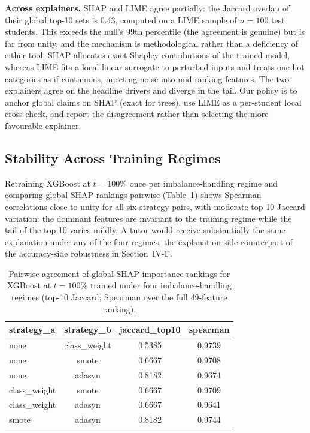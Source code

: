 \documentclass[conference]{IEEEtran}
\begin{document}
\textbf{Across explainers.}
SHAP and LIME agree partially: the Jaccard overlap of their global top-10
sets is 0.43, computed on a LIME sample of $n=100$ test
students. This exceeds the null's 99th percentile (the agreement is genuine)
but is far from unity, and the mechanism is methodological rather than a
deficiency of either tool: SHAP allocates exact Shapley contributions of the
trained model, whereas LIME fits a local linear surrogate to perturbed
inputs and treats one-hot categories as if continuous, injecting noise into
mid-ranking features. The two explainers agree on the headline drivers and
diverge in the tail. Our policy is to anchor global claims on SHAP (exact
for trees), use LIME as a per-student local cross-check, and report the
disagreement rather than selecting the more favourable explainer.

\subsection{Stability Across Training Regimes}

Retraining XGBoost at $t=100\%$ once per imbalance-handling regime and
comparing global SHAP rankings pairwise (Table~\ref{tab:xai_strategies})
shows Spearman correlations close to unity for all six strategy pairs, with
moderate top-10 Jaccard variation: the dominant features are invariant to
the training regime while the tail of the top-10 varies mildly. A tutor
would receive substantially the same explanation under any of the four
regimes, the explanation-side counterpart of the accuracy-side robustness
in Section~IV-F.

\begin{table}[t]
\centering
\caption{Pairwise agreement of global SHAP importance rankings for XGBoost
at $t=100\%$ trained under four imbalance-handling regimes (top-10 Jaccard;
Spearman over the full 49-feature ranking).}
\label{tab:xai_strategies}
\footnotesize
\begin{tabular}{lccc}
\toprule
\textbf{strategy\_a} & \textbf{strategy\_b} & \textbf{jaccard\_top10} & \textbf{spearman} \\
\midrule
none & class\_weight & 0.5385 & 0.9739 \\
none & smote & 0.6667 & 0.9708 \\
none & adasyn & 0.8182 & 0.9674 \\
class\_weight & smote & 0.6667 & 0.9709 \\
class\_weight & adasyn & 0.6667 & 0.9641 \\
smote & adasyn & 0.8182 & 0.9744 \\
\bottomrule
\end{tabular}
\end{table}
\end{document}
